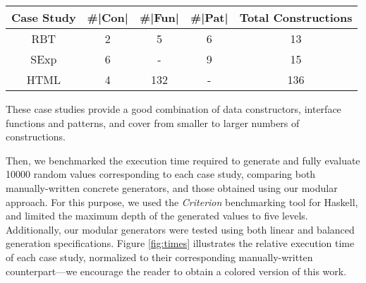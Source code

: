 \vspace{-5pt}
\begin{table}[H]
  \begin{tabular}{||c||c||c||c||c||}
    \hline
    Case Study & \#|Con| & \#|Fun| & \#|Pat| & Total Constructions \\ \hline
    \hline
    RBT        & 2       & 5       & 6       & 13                  \\ \hline
    SExp       & 6       & -       & 9       & 15                  \\ \hline
    HTML       & 4       & 132     & -       & 136                 \\ \hline
  \end{tabular}
\end{table}
\vspace{-5pt}

These case studies provide a good combination of data constructors, interface
functions and patterns, and cover from smaller to larger numbers of
constructions.


Then, we benchmarked the execution time required to generate and fully evaluate
10000 random values corresponding to each case study, comparing both
manually-written concrete generators, and those obtained using our modular
approach.
%
For this purpose, we used the \emph{Criterion} \cite{criterion} benchmarking
tool for Haskell, and limited the maximum depth of the generated values to five
levels.
%
Additionally, our modular generators were tested using both linear and balanced
generation specifications.
%
Figure \ref{fig:times} illustrates the relative execution time of each case
study, normalized to their corresponding manually-written counterpart---we
encourage the reader to obtain a colored version of this work.

